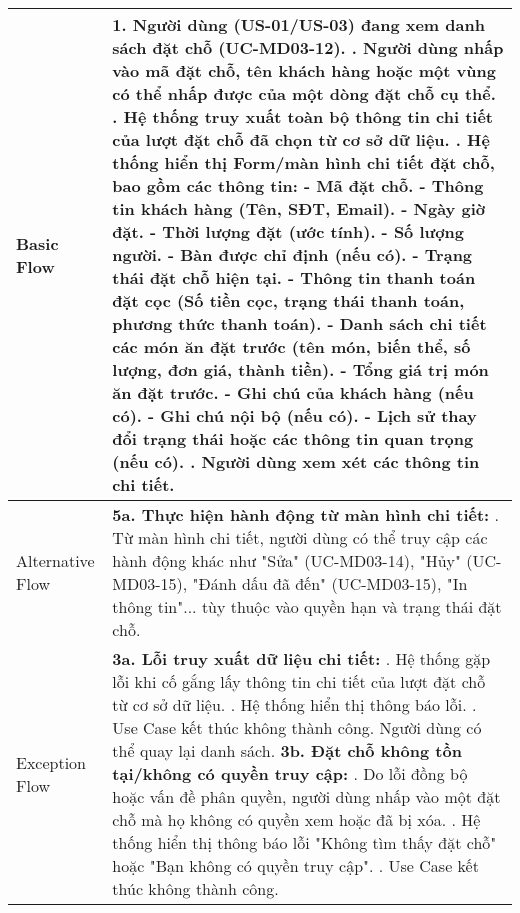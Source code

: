\begin{longtable}{|m{4cm}|p{11cm}|}
Basic Flow & 1. Người dùng (US-01/US-03) đang xem danh sách đặt chỗ (UC-MD03-12). \newline 2. Người dùng nhấp vào mã đặt chỗ, tên khách hàng hoặc một vùng có thể nhấp được của một dòng đặt chỗ cụ thể. \newline 3. Hệ thống truy xuất toàn bộ thông tin chi tiết của lượt đặt chỗ đã chọn từ cơ sở dữ liệu. \newline 4. Hệ thống hiển thị Form/màn hình chi tiết đặt chỗ, bao gồm các thông tin: \newline    - Mã đặt chỗ. \newline    - Thông tin khách hàng (Tên, SĐT, Email). \newline    - Ngày giờ đặt. \newline    - Thời lượng đặt (ước tính). \newline    - Số lượng người. \newline    - Bàn được chỉ định (nếu có). \newline    - Trạng thái đặt chỗ hiện tại. \newline    - Thông tin thanh toán đặt cọc (Số tiền cọc, trạng thái thanh toán, phương thức thanh toán). \newline    - Danh sách chi tiết các món ăn đặt trước (tên món, biến thể, số lượng, đơn giá, thành tiền). \newline    - Tổng giá trị món ăn đặt trước. \newline    - Ghi chú của khách hàng (nếu có). \newline    - Ghi chú nội bộ (nếu có). \newline    - Lịch sử thay đổi trạng thái hoặc các thông tin quan trọng (nếu có). \newline 5. Người dùng xem xét các thông tin chi tiết. \\
\hline
Alternative Flow & \textbf{5a. Thực hiện hành động từ màn hình chi tiết:} \newline    1. Từ màn hình chi tiết, người dùng có thể truy cập các hành động khác như "Sửa" (UC-MD03-14), "Hủy" (UC-MD03-15), "Đánh dấu đã đến" (UC-MD03-15), "In thông tin"... tùy thuộc vào quyền hạn và trạng thái đặt chỗ. \\
\hline
Exception Flow & \textbf{3a. Lỗi truy xuất dữ liệu chi tiết:} \newline    1. Hệ thống gặp lỗi khi cố gắng lấy thông tin chi tiết của lượt đặt chỗ từ cơ sở dữ liệu. \newline    2. Hệ thống hiển thị thông báo lỗi. \newline    3. Use Case kết thúc không thành công. Người dùng có thể quay lại danh sách. \newline \textbf{3b. Đặt chỗ không tồn tại/không có quyền truy cập:} \newline    1. Do lỗi đồng bộ hoặc vấn đề phân quyền, người dùng nhấp vào một đặt chỗ mà họ không có quyền xem hoặc đã bị xóa. \newline    2. Hệ thống hiển thị thông báo lỗi "Không tìm thấy đặt chỗ" hoặc "Bạn không có quyền truy cập". \newline    3. Use Case kết thúc không thành công. \\

\end{longtable}
